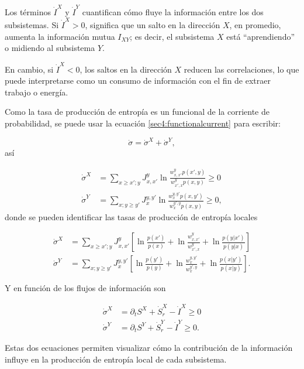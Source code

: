 Los términos \( \dot{I}^{X} \) y \( \dot{I}^{Y} \) cuantifican cómo fluye la información entre los dos subsistemas. Si \( \dot{I}^{X} > 0 \), significa que un salto en la dirección \( X \), en promedio, aumenta la información mutua \( I_{XY} \); es decir, el subsistema \( X \) está ``aprendiendo'' o midiendo al subsistema \( Y \).

En cambio, si \( \dot{I}^{X} < 0 \), los saltos en la dirección \( X \) reducen las correlaciones, lo que puede interpretarse como un consumo de información con el fin de extraer trabajo o energía.

Como la tasa de producción de entropía es un funcional de la corriente de probabilidad, se puede usar la ecuación \ref{sec4:functionalcurrent} para escribir:


 \begin{equation*}
    \dot{\sigma} = \dot{\sigma}^{X} + \dot{\sigma}^{Y},
 \end{equation*}
así

\begin{align*}
    \dot{\sigma}^{X} & = \sum_{x \geq x';y} J_{x,x'}^{y} \ln  \frac{w_{x,x'}^{y} p(x',y) }{w_{x',x}^{y} p(x,y) } \geq 0 \\
    \dot{\sigma}^{Y} & = \sum_{x;y\geq y'}J_{x}^{y,y'} \ln \frac{w_{x}^{y,y'} p(x,y') }{ w_{x}^{y',y} p(x,y) } \geq 0, 
\end{align*}
donde se pueden identificar las tasas de producción de entropía locales

\begin{align*}
    \dot{\sigma}^{X} &  = \sum_{x \geq x';y} J_{x,x'}^{y} \left[ \ln \frac{p(x')}{p(x)}  +\ln \frac{w_{x,x'}^{y}}{ w_{x',x}^{y} } + \ln \frac{p(y|x')}{p(y|x)} \right] \\
    \dot{\sigma}^{Y} &  = \sum_{x;y \geq y'} J_{x}^{y,y'} \left[ \ln \frac{p(y')}{p(y)}  + \ln \frac{w_{x}^{y,y'}}{ w_{x}^{y',y} } + \ln \frac{p(x|y')}{p(x|y)} \right].
\end{align*}

Y en función de los flujos de información son  

\begin{align*}
    \dot{\sigma}^{X} & = \partial_{t}S^{X} + \dot{S}_{r}^{X} - \dot{I}^{X} \geq 0 \\
    \dot{\sigma}^{Y} & = \partial_{t}S^{Y} + \dot{S}_{r}^{Y} - \dot{I}^{Y} \geq 0.
\end{align*}

Estas dos ecuaciones permiten visualizar cómo la contribución de la información influye en la producción de entropía local de cada subsistema.

